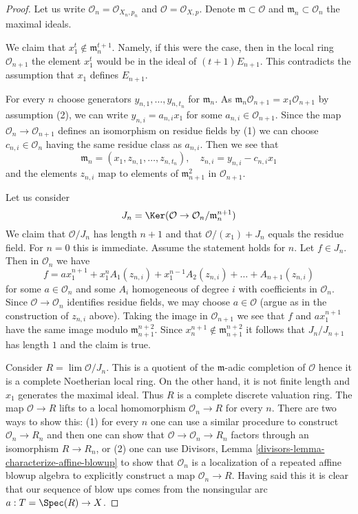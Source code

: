 \begin{proof}
Let us write $\mathcal{O}_n = \mathcal{O}_{X_n, p_n}$
and $\mathcal{O} = \mathcal{O}_{X, p}$. Denote
$\mathfrak m \subset \mathcal{O}$ and $\mathfrak m_n \subset \mathcal{O}_n$
the maximal ideals.

\medskip\noindent
We claim that $x_1^t \not \in \mathfrak m_n^{t + 1}$.
Namely, if this were the case, then in the local ring
$\mathcal{O}_{n + 1}$ the element $x_1^t$ would be in the ideal of
$(t + 1)E_{n + 1}$.
This contradicts the assumption that $x_1$ defines $E_{n + 1}$.

\medskip\noindent
For every $n$ choose generators $y_{n, 1}, \ldots, y_{n, t_n}$
for $\mathfrak m_n$. As
$\mathfrak m_n \mathcal{O}_{n + 1} = x_1\mathcal{O}_{n + 1}$
by assumption (2), we can write $y_{n, i} = a_{n, i} x_1$
for some $a_{n, i} \in \mathcal{O}_{n + 1}$. Since
the map $\mathcal{O}_n \to \mathcal{O}_{n + 1}$ defines
an isomorphism on residue fields by (1) we can choose
$c_{n, i} \in \mathcal{O}_n$ having the same residue class as
$a_{n, i}$. Then we see that
$$
\mathfrak m_n = (x_1, z_{n, 1}, \ldots, z_{n, t_n}),
\quad z_{n, i} = y_{n, i} - c_{n, i} x_1
$$
and the elements $z_{n, i}$ map to elements of $\mathfrak m_{n + 1}^2$
in $\mathcal{O}_{n + 1}$.

\medskip\noindent
Let us consider
$$
J_n = \Ker(\mathcal{O} \to \mathcal{O}_n/\mathfrak m_n^{n + 1})
$$
We claim that $\mathcal{O}/J_n$ has length $n + 1$ and that
$\mathcal{O}/(x_1) + J_n$ equals the residue field. For $n = 0$
this is immediate. Assume the statement holds for $n$.
Let $f \in J_n$. Then in $\mathcal{O}_n$ we have
$$
f = a x_1^{n + 1} + x_1^n A_1(z_{n, i}) +
x_1^{n - 1} A_2(z_{n, i}) + \ldots + A_{n + 1}(z_{n, i})
$$
for some $a \in \mathcal{O}_n$ and some $A_i$ homogeneous of degree $i$
with coefficients in $\mathcal{O}_n$. Since $\mathcal{O} \to \mathcal{O}_n$
identifies residue fields, we may choose $a \in \mathcal{O}$
(argue as in the construction of $z_{n, i}$ above).
Taking the image in
$\mathcal{O}_{n + 1}$ we see that $f$ and $a x_1^{n + 1}$
have the same image modulo $\mathfrak m_{n + 1}^{n + 2}$.
Since $x_n^{n + 1} \not \in \mathfrak m_{n + 1}^{n + 2}$
it follows that $J_n/J_{n + 1}$ has length $1$ and the claim is true.

\medskip\noindent
Consider $R = \lim \mathcal{O}/J_n$. This is a quotient of
the $\mathfrak m$-adic completion of $\mathcal{O}$ hence it is
a complete Noetherian local ring. On the other hand, it is
not finite length and $x_1$ generates the maximal ideal.
Thus $R$ is a complete discrete valuation ring.
The map $\mathcal{O} \to R$ lifts to a local homomorphism
$\mathcal{O}_n \to R$ for every $n$. There are two ways to show this:
(1) for every $n$ one can use a similar procedure
to construct $\mathcal{O}_n \to R_n$ and then one can
show that $\mathcal{O} \to \mathcal{O}_n \to R_n$ factors
through an isomorphism $R \to R_n$, or (2) one can use
Divisors, Lemma \ref{divisors-lemma-characterize-affine-blowup}
to show that $\mathcal{O}_n$ is a localization of a repeated
affine blowup algebra to explicitly construct a map $\mathcal{O}_n \to R$.
Having said this it is clear that our sequence of blow ups
comes from the nonsingular arc $a : T = \Spec(R) \to X$.
\end{proof}

